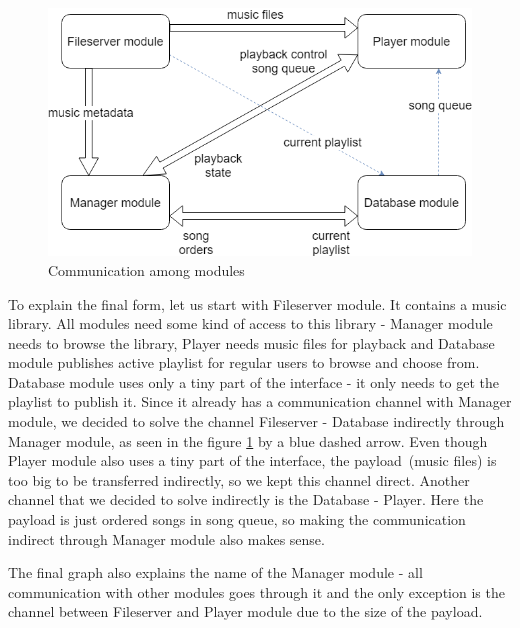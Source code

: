 \begin{figure}[ht]\centering
\includegraphics[width=1.0\textwidth]{img/CommunicationGraph}
\caption{Communication among modules}
\label{fig02:communicationAmongModules}
\end{figure}

\par
To explain the final form, let us start with Fileserver module. It contains a music library. All modules need some kind of access to this library - Manager module needs to browse the library, Player needs music files for playback and Database module publishes active playlist for regular users to browse and choose from. Database module uses only a tiny part of the interface - it only needs to get the playlist to publish it. Since it already has a communication channel with Manager module, we decided to solve the channel Fileserver - Database indirectly through Manager module, as seen in the figure \ref{fig02:communicationAmongModules} by a blue dashed arrow. Even though Player module also uses a tiny part of the interface, the payload~(music files) is too big to be transferred indirectly, so we kept this channel direct. Another channel that we decided to solve indirectly is the Database - Player. Here the payload is just ordered songs in song queue, so making the communication indirect through Manager module also makes sense.
\par
The final graph also explains the name of the Manager module - all communication with other modules goes through it and the only exception is the channel between Fileserver and Player module due to the size of the payload.

